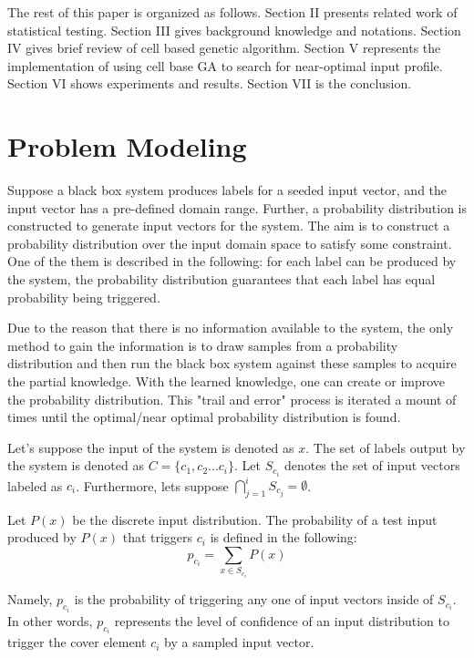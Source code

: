 \documentclass[conference]{IEEEtran}
\begin{document}
The rest of this paper is organized as follows. Section II presents related work of statistical testing. Section III gives background knowledge and notations. Section IV gives brief review of cell based genetic algorithm. Section V represents the implementation of using cell base GA to search for near-optimal input profile. Section VI shows experiments and results. Section VII is the conclusion.\\

\section{Problem Modeling}
Suppose a black box system produces labels for a seeded input vector, and the input vector has a pre-defined domain range. Further, a probability distribution is constructed to generate input vectors for the system. The aim is to construct a probability distribution over the input domain space to satisfy some constraint. One of the them is described in the following: for each label can be produced by the system, the probability distribution guarantees that each label has equal probability being triggered.

Due to the reason that there is no information available to the system, the only method to gain the information is to draw samples from a probability distribution and then run the black box system against these samples to acquire the partial knowledge. With the learned knowledge, one can create or improve the probability distribution. This "trail and error" process is iterated a mount of times until the optimal/near optimal probability distribution is found.

Let's suppose the input of the system is denoted as \(x\). The set of labels output by the system is denoted as \(C = \{c_1,c_2 ... c_i\}\). Let \(S_{c_{i}}\) denotes the set of input vectors labeled as \(c_{i}\). Furthermore, lets suppose \(\bigcap_{j=1}^i S_{c_{j}} = \emptyset\). 

Let \(P(x)\) be the discrete input distribution. The probability of a test input produced by \(P(x)\) that triggers \(c_{i}\) is defined in the following:\[\label{eq:ability}p_{c_i} = \sum_{x \in S_{c_i}} P(x)\]

Namely, \(p_{c_{i}}\) is the probability of triggering any one of input vectors inside of \(S_{c_i}\).
In other words, \(p_{c_{i}}\) represents the level of confidence  of an input distribution to trigger the cover element \(c_{i}\) by a sampled input vector.
\end{document}
